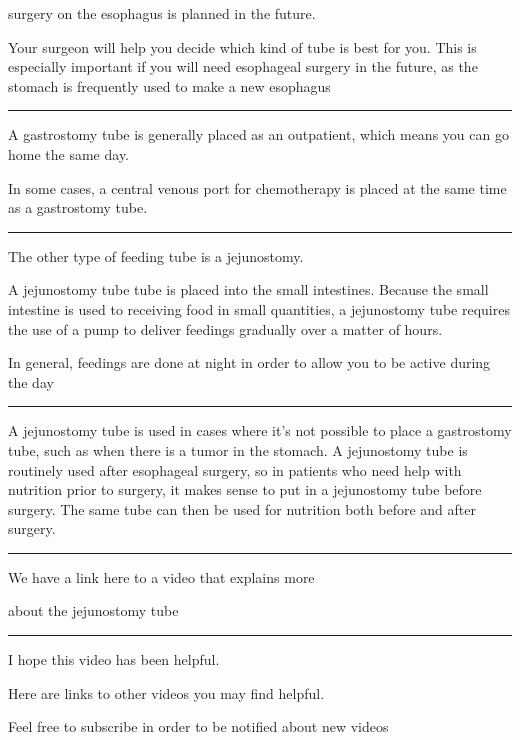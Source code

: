 \documentclass[
]{article}
\begin{document}
surgery on the esophagus is planned in the future.

Your surgeon will help you decide which kind of tube is best for you.
This is especially important if you will need esophageal surgery in the
future, as the stomach is frequently used to make a new esophagus

\begin{center}\rule{0.5\linewidth}{0.5pt}\end{center}

A gastrostomy tube is generally placed as an outpatient, which means you
can go home the same day.

In some cases, a central venous port for chemotherapy is placed at the
same time as a gastrostomy tube.

\begin{center}\rule{0.5\linewidth}{0.5pt}\end{center}

The other type of feeding tube is a jejunostomy.

A jejunostomy tube tube is placed into the small intestines. Because the
small intestine is used to receiving food in small quantities, a
jejunostomy tube requires the use of a pump to deliver feedings
gradually over a matter of hours.

In general, feedings are done at night in order to allow you to be
active during the day

\begin{center}\rule{0.5\linewidth}{0.5pt}\end{center}

A jejunostomy tube is used in cases where it's not possible to place a
gastrostomy tube, such as when there is a tumor in the stomach. A
jejunostomy tube is routinely used after esophageal surgery, so in
patients who need help with nutrition prior to surgery, it makes sense
to put in a jejunostomy tube before surgery. The same tube can then be
used for nutrition both before and after surgery.

\begin{center}\rule{0.5\linewidth}{0.5pt}\end{center}

We have a link here to a video that explains more

about the jejunostomy tube

\begin{center}\rule{0.5\linewidth}{0.5pt}\end{center}

I hope this video has been helpful.

Here are links to other videos you may find helpful.

Feel free to subscribe in order to be notified about new videos
\end{document}
